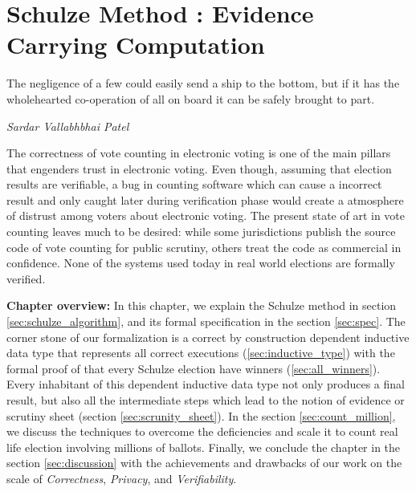 \chapter{Schulze Method : Evidence Carrying Computation}
\label{cha:schulze_method}

\epigraph{The negligence of a few could easily send a ship to the bottom, but if it has the wholehearted 
co-operation of all on board it can be safely brought to part.} 
{\textit{Sardar Vallabhbhai Patel}} 

 The correctness of vote counting in electronic voting is one of 
 the main pillars that engenders trust in electronic voting. Even 
 though, assuming  that election results are verifiable, a bug in 
 counting software which can cause a incorrect result and only 
 caught later during verification phase would create a atmosphere of 
 distrust among voters about electronic voting. The present state of 
 art in vote counting leaves much to be desired: while some 
 jurisdictions publish the source code of vote counting for 
 public scrutiny, others treat the code as commercial in confidence. 
 None of the systems used today in real world elections are 
 formally verified.
 
 \textbf{Chapter overview:} In this chapter, we explain the Schulze method in section \ref{sec:schulze_algorithm}, 
 and its formal specification in the section \ref{sec:spec}. The  corner stone of our formalization is 
 a correct by construction dependent inductive data type 
 that represents all correct executions (\ref{sec:inductive_type}) with the formal proof of
 that every Schulze election have winners (\ref{sec:all_winners}).  Every inhabitant of 
 this dependent inductive data type not only produces a final result, but also all the 
 intermediate steps which lead to the notion of evidence or scrutiny sheet (section 
  \ref{sec:scrunity_sheet}).  In the section \ref{sec:count_million}, we discuss the techniques
   to overcome the deficiencies and scale it to count real life election involving millions of 
   ballots.  Finally, we conclude the chapter in the section \ref{sec:discussion} with 
   the achievements and drawbacks of our work on the scale of \textit{Correctness},
   \textit{Privacy}, and \textit{Verifiability}.
 
%  



